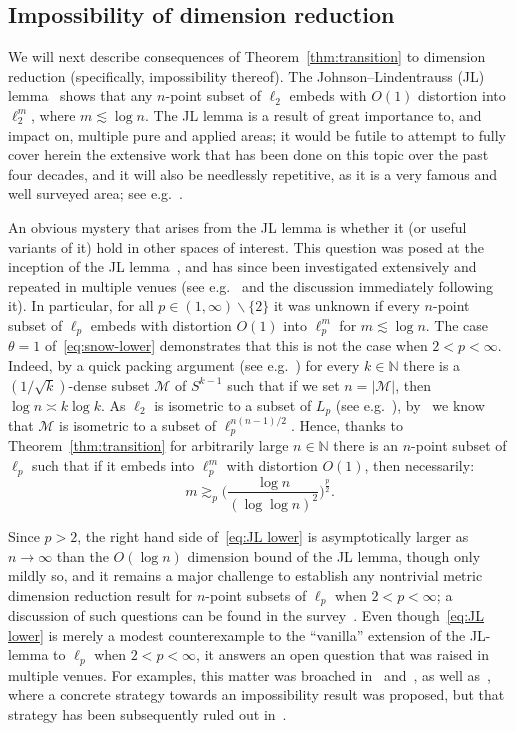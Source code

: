 \documentclass[11pt,reqno]{amsart}
\newcommand{\N}{\mathbb{N}}
\renewcommand{\setminus}{\smallsetminus}
\newcommand{\MM}{\mathcal{M}}
\newcommand{\1}{\mathbf{1}}
\begin{document}
\subsection{Impossibility of dimension reduction} We will next describe consequences of Theorem~\ref{thm:transition}  to   dimension reduction (specifically, impossibility thereof). The Johnson--Lindentrauss (JL) lemma~\cite{JL} shows that any $n$-point subset of $\ell_2$ embeds with $O(1)$ distortion into $\ell_2^{m}$, where $m\lesssim \log n$. The JL lemma  is a result of great importance to, and impact on, multiple pure and applied areas; it would be futile to attempt to fully cover  herein the extensive work that has been done on this topic over the past four decades, and it will also be needlessly repetitive, as it is a very famous and well surveyed area; see e.g.~\cite{Vem04,Naor-ribe,BCFG23,DGLX25}.


An obvious mystery that arises from the JL lemma is whether it (or useful variants of it) hold in other spaces of interest. This question was posed at the inception of the JL lemma~\cite[Problem~3]{JL}, and has since been investigated extensively and repeated in multiple venues (see e.g.~\cite[Question~13]{Naor-ribe} and the discussion immediately following it). In particular, for all $p\in (1,\infty)\setminus \{2\}$ it was unknown if every $n$-point subset of $\ell_p$ embeds with distortion $O(1)$ into $\ell_p^m$ for $m\lesssim \log n$. The case $\theta=1$ of~\eqref{eq:snow-lower} demonstrates that this is not the case when $2<p<\infty$. Indeed, by a quick packing argument (see e.g.~\cite[Lemma~2.6]{MS86}) for every $k\in \N$ there is a $(1/\sqrt{k})$-dense  subset $\MM$ of $S^{k-1}$ such that if we set $n=|\MM|$, then  $\log n\asymp k\log k$. As $\ell_2$ is isometric to a subset of $L_p$ (see e.g.~\cite[Proposition~6.4.12]{AK16}), by~\cite{Bal90} we know that  $\MM$ is isometric to a subset of $\ell_p^{n(n-1)/2}$. Hence, thanks to Theorem~\ref{thm:transition} for arbitrarily large $n\in \N$ there is an $n$-point subset of $\ell_p$ such that if it embeds into $\ell_p^m$ with distortion $O(1)$, then necessarily: 
\begin{equation}\label{eq:JL lower}
m\gtrsim_p \bigg(\frac{\log n}{(\log\log n)^2}\bigg)^{\frac{p}{2}}.
\end{equation}

Since $p>2$, the right hand side of~\eqref{eq:JL lower} is asymptotically larger  as $n\to \infty$ than the $O(\log n)$ dimension bound of the JL lemma, though only mildly so, and it remains a major challenge to establish any nontrivial metric dimension reduction result for $n$-point subsets of $\ell_p$ when $2<p<\infty$; a  discussion of such questions can be found in the survey~\cite{Naor-ribe}.  Even though~\eqref{eq:JL lower}  is merely a modest counterexample to the ``vanilla'' extension of the JL-lemma to $\ell_p$ when $2<p<\infty$, it answers an open question that was raised in multiple venues. For examples, this matter was broached in~\cite[Problem~3.2]{Mat-problems} and~\cite[Question~13]{Naor-ribe}, as well as~\cite[Problem~5.2]{Mat-problems}, where a concrete strategy towards an impossibility result was proposed, but that strategy has been subsequently ruled out in~\cite{CK05}. 
\end{document}
